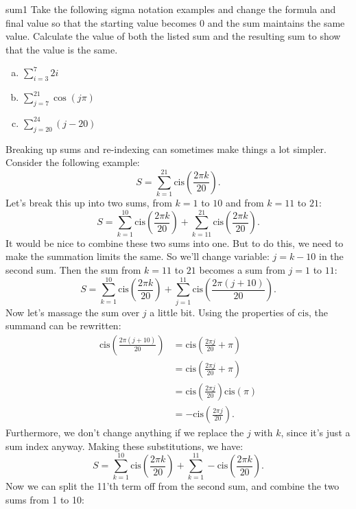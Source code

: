 \begin{exercise}{sum1}
Take the following sigma notation examples and change the formula and final value so that the starting value becomes 0 and the sum maintains the same value.  Calculate the value of both the listed sum and the resulting sum to show that the value is the same.
\begin{enumerate} [(a)]
 \item
$\displaystyle{\sum_{i=3}^{7}2i}$
\item
$\displaystyle{\sum_{j=7}^{21}\cos(j\pi )}$
\item
$\displaystyle{\sum_{j=20}^{24}(j-20)}$
\end {enumerate}
\end{exercise}


Breaking up sums and re-indexing can sometimes make things a lot simpler. Consider the following example:
\[ S = \sum_{k=1}^{21} \text{cis} \left(\frac{2\pi k}{20} \right). \]
Let's break this up into two sums, from $k = 1$ to $10$ and from $k=11$ to $21$:
\[ S = \sum_{k=1}^{10} \text{cis} \left(\frac{2\pi k}{20} \right)
+ \sum_{k=11}^{21} \text{cis} \left(\frac{2\pi k}{20} \right). \]
It would be nice to combine these two sums into one.  But to do this, we need to make the summation limits the same. So we'll change variable:  $j = k-10$ in the second sum. Then the sum from $k=11$ to $21$ becomes a sum from $j=1$ to $11$:
\[ S = \sum_{k=1}^{10} \text{cis} \left(\frac{2\pi k}{20} \right)
+ \sum_{j=1}^{11} \text{cis} \left(\frac{2\pi (j+10)}{20} \right). \]
Now let's massage the sum  over $j$ a little bit.  Using the properties of $\text{cis}$, the summand can be rewritten:
\begin{align*}
\text{cis} \left(\frac{2\pi (j+10)}{20} \right) &= \text{cis} \left(\frac{2\pi j}{20} + \pi \right) \\
&= \text{cis}\left(\frac{2\pi j}{20} + \pi \right)\\
&= \text{cis}\left(\frac{2\pi j}{20}\right)\text{cis}(\pi)\\
& = -\text{cis}\left(\frac{2\pi j}{20}\right).
\end{align*}
Furthermore, we don't change anything if we replace the $j$ with $k$, since it's just a sum index anyway. Making these substitutions, we have:
\[ S = \sum_{k=1}^{10} \text{cis} \left(\frac{2\pi k}{20} \right)
+ \sum_{k=1}^{11} -\text{cis} \left(\frac{2\pi k}{20} \right). \]
Now we can split the 11'th term off from the second sum, and combine the two sums from 1 to 10:
